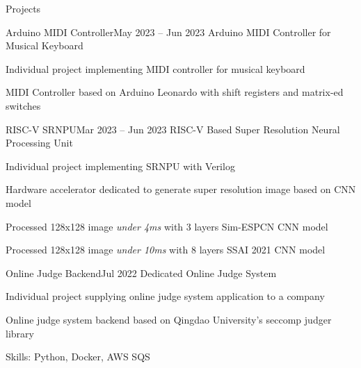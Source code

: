 \documentclass{resume}
\begin{document}
\begin{rSection}{Projects}
    \begin{rSubsection}{Arduino MIDI Controller}{May 2023 -- Jun 2023}
        Arduino MIDI Controller for Musical Keyboard

        \item Individual project implementing MIDI controller for musical keyboard

        \item MIDI Controller based on Arduino Leonardo with shift registers and matrix-ed switches
    \end{rSubsection}

    \begin{rSubsection}{RISC-V SRNPU}{Mar 2023 -- Jun 2023}
        RISC-V Based Super Resolution Neural Processing Unit

        \item Individual project implementing SRNPU with Verilog

        \item Hardware accelerator dedicated to generate super resolution image based on CNN model

        \item Processed 128x128 image \emph{under 4ms} with 3 layers Sim-ESPCN CNN model

        \item Processed 128x128 image \emph{under 10ms} with 8 layers SSAI 2021 CNN model
    \end{rSubsection}

    \begin{rSubsection}{Online Judge Backend}{Jul 2022}
        Dedicated Online Judge System

        \item Individual project supplying online judge system application to a company

        \item Online judge system backend based on Qingdao University's seccomp judger library

        \item Skills: Python, Docker, AWS SQS
    \end{rSubsection}
    
\end{rSection}
\end{document}

